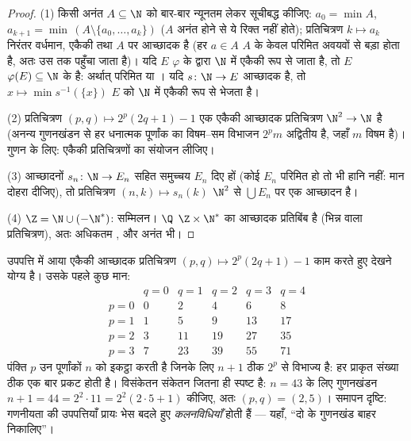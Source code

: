 \begin{proof}
(1) किसी अनंत $A \subseteq \N$ को बार-बार न्यूनतम लेकर सूचीबद्ध कीजिए: $a_0 =
\min A$, $a_{k+1} = \min\,(A \setminus \{a_0, \dots, a_k\})$
($A$ अनंत होने से ये रिक्त नहीं होते); प्रतिचित्रण $k \mapsto a_k$ निरंतर
वर्धमान, एकैकी तथा $A$ पर आच्छादक है (हर $a \in A$ $A$ के केवल परिमित
अवयवों से बड़ा होता है, अतः उस तक पहुँचा जाता है)। यदि $E$ $\varphi$ के
द्वारा $\N$ में एकैकी रूप से जाता है, तो $E$ $\varphi(E) \subseteq \N$ के  है:
अर्थात् परिमित या । यदि $s \colon \N \to
E$ आच्छादक है, तो $x \mapsto \min s^{-1}(\{x\})$ $E$ को
$\N$ में एकैकी रूप से भेजता है।

(2) प्रतिचित्रण $(p, q) \mapsto 2^p(2q + 1) - 1$ एक एकैकी आच्छादक प्रतिचित्रण $\N^2
\to \N$ है (अनन्य
गुणनखंडन से हर धनात्मक पूर्णांक का विषम--सम विभाजन $2^p m$ अद्वितीय है,
जहाँ $m$ विषम है)। गुणन के लिए: एकैकी प्रतिचित्रणों का संयोजन लीजिए।

(3) आच्छादनों $s_n \colon \N \to E_n$ सहित समुच्चय $E_n$ दिए हों (कोई $E_n$ परिमित हो तो
भी हानि नहीं: मान दोहरा दीजिए), तो प्रतिचित्रण $(n, k)
\mapsto s_n(k)$  $\N^2$ से
$\bigcup E_n$ पर एक आच्छादन है।

(4) $\Z = \N \cup (-\N^*)$:  सम्मिलन। $\Q$ $\Z \times \N^*$ का आच्छादक प्रतिबिंब है
(भिन्न वाला प्रतिचित्रण), अतः अधिकतम , और अनंत भी।
\end{proof}

\begin{example}\label{ex:b2:structures:pairing}
उपपत्ति में आया एकैकी आच्छादक प्रतिचित्रण $(p, q) \mapsto 2^p(2q + 1) - 1$ काम करते हुए देखने
योग्य है। उसके पहले कुछ मान:
\[
\begin{array}{c|ccccc}
 & q = 0 & q = 1 & q = 2 & q = 3 & q = 4\\
\hline
p = 0 & 0 & 2 & 4 & 6 & 8\\
p = 1 & 1 & 5 & 9 & 13 & 17\\
p = 2 & 3 & 11 & 19 & 27 & 35\\
p = 3 & 7 & 23 & 39 & 55 & 71
\end{array}
\]
पंक्ति $p$ उन पूर्णांकों $n$ को इकट्ठा करती है जिनके लिए $n + 1$ ठीक $2^p$
से विभाज्य है: हर प्राकृत संख्या ठीक एक बार प्रकट होती है। विसंकेतन
संकेतन जितना ही स्पष्ट है: $n = 43$ के लिए गुणनखंडन $n + 1
= 44 = 2^2\cdot 11 = 2^2(2\cdot5 + 1)$ कीजिए, अतः $(p, q) = (2, 5)$।
समापन दृष्टि: गणनीयता की उपपत्तियाँ प्रायः भेस बदले हुए
\emph{कलनविधियाँ} होती हैं --- यहाँ, ``दो के गुणनखंड बाहर निकालिए''।
\end{example}

